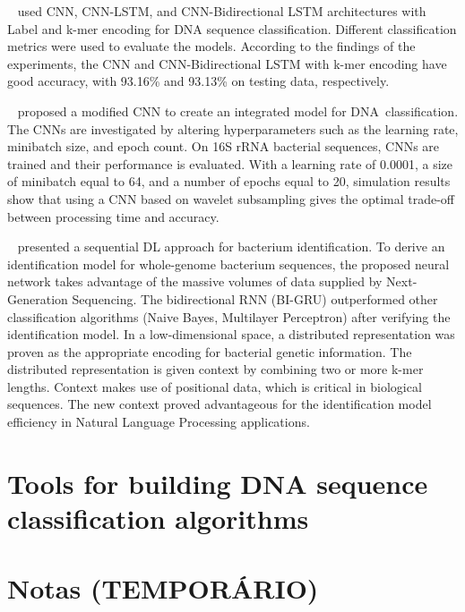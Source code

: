 \citeauthor{Gunasekaran2021AnalysisModels}~\cite{Gunasekaran2021AnalysisModels} used \gls{CNN}, \gls{CNN}-\gls{LSTM}, and \gls{CNN}-Bidirectional \gls{LSTM} architectures with Label and k-mer encoding for \gls{DNA} sequence classification. Different classification metrics were used to evaluate the models. According to the findings of the experiments, the \gls{CNN} and \gls{CNN}-Bidirectional \gls{LSTM} with k-mer encoding have good accuracy, with 93.16\% and 93.13\% on testing data, respectively.

\citeauthor{Soliman2021AnClassification}~\cite{Soliman2021AnClassification} proposed a modified \gls{CNN} to create an integrated model for \gls{DNA} classification. The \gls{CNN}s are investigated by altering hyperparameters such as the learning rate, minibatch size, and epoch count. On 16S rRNA bacterial sequences, \gls{CNN}s are trained and their performance is evaluated. With a learning rate of 0.0001, a size of minibatch equal to 64, and a number of epochs equal to 20, simulation results show that using a \gls{CNN} based on wavelet subsampling gives the optimal trade-off between processing time and accuracy.

\citeauthor{Lugo2021AIdentification}~\cite{Lugo2021AIdentification} presented a sequential \gls{DL} approach for bacterium identification. To derive an identification model for whole-genome bacterium sequences, the proposed neural network takes advantage of the massive volumes of data supplied by Next-Generation Sequencing. The bidirectional \gls{RNN} (BI-\gls{GRU}) outperformed other classification algorithms (Naive Bayes, Multilayer Perceptron) after verifying the identification model. In a low-dimensional space, a distributed representation was proven as the appropriate encoding for bacterial genetic information. The distributed representation is given context by combining two or more k-mer lengths. Context makes use of positional data, which is critical in biological sequences. The new context proved advantageous for the identification model efficiency in Natural Language Processing applications. 


\section{Tools for building DNA sequence classification algorithms}

\section{Notas (TEMPORÁRIO)}

